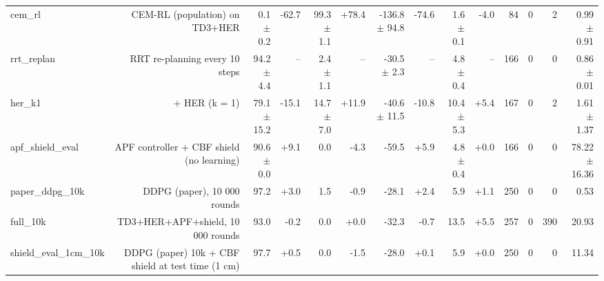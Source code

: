 \begin{table}[t]
\begin{tabular}{lrrrrrrrrrrrrr}
cem\_rl & CEM-RL (population) on TD3+HER & 0.1 $\pm$ 0.2 & -62.7 & 99.3 $\pm$ 1.1 & +78.4 & -136.8 $\pm$ 94.8 & -74.6 & 1.6 $\pm$ 0.1 & -4.0 & 84 & 0 & 2 & 0.99 $\pm$ 0.91 \\
rrt\_replan & RRT re-planning every 10 steps & 94.2 $\pm$ 4.4 & -- & 2.4 $\pm$ 1.1 & -- & -30.5 $\pm$ 2.3 & -- & 4.8 $\pm$ 0.4 & -- & 166 & 0 & 0 & 0.86 $\pm$ 0.01 \\
her\_k1 & + HER (k = 1) & 79.1 $\pm$ 15.2 & -15.1 & 14.7 $\pm$ 7.0 & +11.9 & -40.6 $\pm$ 11.5 & -10.8 & 10.4 $\pm$ 5.3 & +5.4 & 167 & 0 & 2 & 1.61 $\pm$ 1.37 \\
apf\_shield\_eval & APF controller + CBF shield (no learning) & 90.6 $\pm$ 0.0 & +9.1 & 0.0 & -4.3 & -59.5 & +5.9 & 4.8 $\pm$ 0.4 & +0.0 & 166 & 0 & 0 & 78.22 $\pm$ 16.36 \\
paper\_ddpg\_10k & DDPG (paper), 10 000 rounds & 97.2 & +3.0 & 1.5 & -0.9 & -28.1 & +2.4 & 5.9 & +1.1 & 250 & 0 & 0 & 0.53 \\
full\_10k & TD3+HER+APF+shield, 10 000 rounds & 93.0 & -0.2 & 0.0 & +0.0 & -32.3 & -0.7 & 13.5 & +5.5 & 257 & 0 & 390 & 20.93 \\
shield\_eval\_1cm\_10k & DDPG (paper) 10k + CBF shield at test time (1 cm) & 97.7 & +0.5 & 0.0 & -1.5 & -28.0 & +0.1 & 5.9 & +0.0 & 250 & 0 & 0 & 11.34 \\
\bottomrule
\end{tabular}
\end{table}